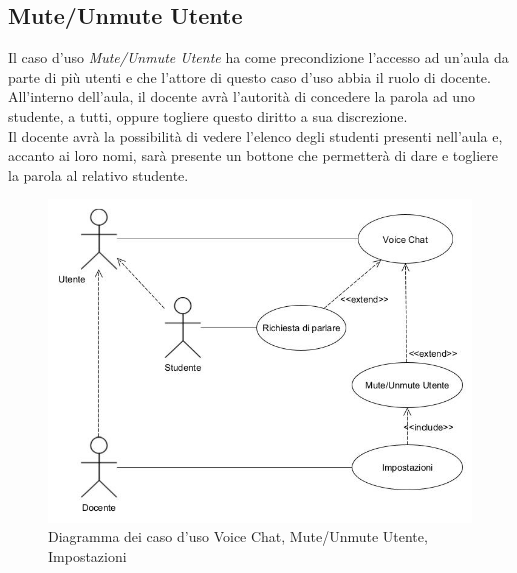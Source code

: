 \subsection{Mute/Unmute Utente}
Il caso d'uso \textit{Mute/Unmute Utente} ha come precondizione l'accesso ad un'aula da parte di più utenti e che l'attore di questo caso d'uso abbia il ruolo di docente. \\All'interno dell'aula, il docente avrà l'autorità di concedere la parola ad uno studente, a tutti, oppure togliere questo diritto a sua discrezione. \\Il docente avrà la possibilità di vedere l'elenco degli studenti presenti nell'aula e, accanto ai loro nomi, sarà presente un bottone che permetterà di dare e togliere la parola al relativo studente.
\begin{figure}[H]
    \centering
    \includegraphics[scale=0.6]{Immagini/VoiceChatUseCase.jpg}
    \caption{Diagramma dei caso d'uso Voice Chat, Mute/Unmute Utente, Impostazioni}
    \label{fig:my_label}
\end{figure}

